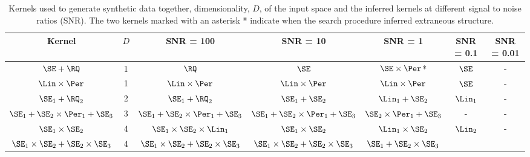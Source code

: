 \begin{table*}[ht!]
\caption{{\small
Kernels used to generate synthetic data together, dimensionality, $D$, of the input space and the inferred kernels at different signal to noise ratios (SNR).
The two kernels marked with an asterisk * indicate when the search procedure inferred extraneous structure.
}}
\label{tbl:synthetic}
\begin{center}
{\tiny
\begin{tabular}{c c | c c c c c}
Kernel & $D$ & SNR = 100 & SNR = 10 & SNR = 1 & SNR = 0.1 & SNR = 0.01 \\
\hline
$\SE + \RQ$                               & 1 & $\RQ$
                                              & $\SE$
                                              & $\SE \times \Per$*
                                              & $\SE$
                                              & - \\
$\Lin \times \Per$                        & 1 & $\Lin \times \Per$ 
                                              & $\Lin \times \Per$
                                              & $\Lin \times \Per$
                                              & $\SE$
                                              & - \\
$\SE_1 + \RQ_2$                           & 2 & $\SE_1 + \RQ_2$
                                              & $\SE_1 + \SE_2$
                                              & $\Lin_1 + \SE_2$ 
                                              & $\Lin_1$
                                              & - \\
$\SE_1 + \SE_2 \times \Per_1 + \SE_3$     & 3 & $\SE_1 + \SE_2 \times \Per_1 + \SE_3$
                                              & $\SE_1 + \SE_2 \times \Per_1 + \SE_3$
                                              & $\SE_2 \times \Per_1 + \SE_3$
                                              & -
                                              & - \\
$\SE_1 \times \SE_2$                      & 4 & $\SE_1 \times \SE_2 \times \Lin_1$
                                              & $\SE_1 \times \SE_2$
                                              & $\Lin_1 \times \SE_2$
                                              & $\Lin_2$
                                              & - \\
$\SE_1 \times \SE_2 + \SE_2 \times \SE_3$ & 4 & $\SE_1 \times \SE_2 + \SE_2 \times \SE_3$
                                              & $\SE_1 \times \SE_2 + \SE_2 \times \SE_3$
                                              & $\SE_1 + \SE_2 \times \SE_3$

\end{tabular}}
\end{center}
\end{table*}
